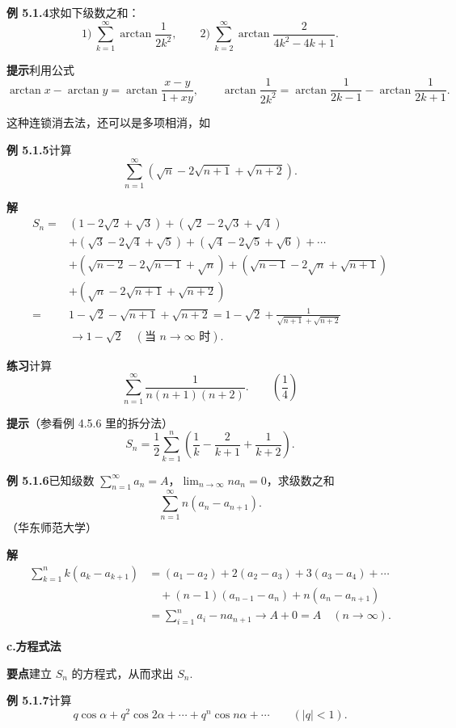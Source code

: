 \documentclass[UTF8, 12pt, fontset=fandol, oneside]{ctexart}
\begin{document}
\noindent\textbf{例 5.1.4}\quad 求如下级数之和：
\[
  1)\ \sum_{k=1}^\infty \arctan\frac1{2k^2},\qquad
  2)\ \sum_{k=2}^\infty \arctan\frac2{4k^2-4k+1}.
\]

\noindent\textbf{提示}\quad 利用公式
\[
  \arctan x-\arctan y=\arctan\frac{x-y}{1+xy},\qquad
  \arctan\frac1{2k^2}=\arctan\frac1{2k-1}-\arctan\frac1{2k+1}.
\]

这种连锁消去法，还可以是多项相消，如

\noindent\textbf{例 5.1.5}\quad 计算
\[
  \sum_{n=1}^\infty\left(\sqrt n-2\sqrt{n+1}+\sqrt{n+2}\right).
\]

\noindent\textbf{解}\quad
\[
\begin{aligned}
S_n={}&(1-2\sqrt2+\sqrt3)+(\sqrt2-2\sqrt3+\sqrt4)\\
&+(\sqrt3-2\sqrt4+\sqrt5)+(\sqrt4-2\sqrt5+\sqrt6)+\cdots\\
&+\left(\sqrt{n-2}-2\sqrt{n-1}+\sqrt n\right)
 +\left(\sqrt{n-1}-2\sqrt n+\sqrt{n+1}\right)\\
&+\left(\sqrt n-2\sqrt{n+1}+\sqrt{n+2}\right)\\
={}&1-\sqrt2-\sqrt{n+1}+\sqrt{n+2}
=1-\sqrt2+\frac1{\sqrt{n+1}+\sqrt{n+2}}\\
&\to 1-\sqrt2\quad(\text{当 }n\to\infty\text{ 时}).
\end{aligned}
\]

\noindent\textbf{练习}\quad 计算
\[
  \sum_{n=1}^\infty \frac1{n(n+1)(n+2)}.\qquad\left(\frac14\right)
\]

\noindent\textbf{提示}\quad （参看例 4.5.6 里的拆分法）
\[
  S_n=\frac12\sum_{k=1}^n\left(\frac1k-\frac2{k+1}+\frac1{k+2}\right).
\]

\noindent\textbf{例 5.1.6}\quad 已知级数 $\displaystyle\sum_{n=1}^\infty a_n=A$，$\displaystyle\lim_{n\to\infty}na_n=0$，求级数之和
\[
  \sum_{n=1}^\infty n(a_n-a_{n+1}).
\]
（华东师范大学）

\noindent\textbf{解}\quad
\[
\begin{aligned}
\sum_{k=1}^n k(a_k-a_{k+1})
&=(a_1-a_2)+2(a_2-a_3)+3(a_3-a_4)+\cdots\\
&\quad+(n-1)(a_{n-1}-a_n)+n(a_n-a_{n+1})\\
&=\sum_{i=1}^n a_i-na_{n+1}\to A+0=A\quad(n\to\infty).
\end{aligned}
\]

\noindent\textbf{c.\quad 方程式法}

\noindent\textbf{要点}\quad 建立 $S_n$ 的方程式，从而求出 $S_n$.

\noindent\textbf{例 5.1.7}\quad 计算
\[
  q\cos\alpha+q^2\cos2\alpha+\cdots+q^n\cos n\alpha+\cdots\qquad(|q|<1).
\]
\end{document}
